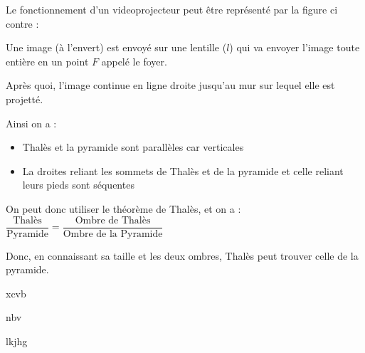 \begin{minipage}[t]{0.55\textwidth}

    Le fonctionnement d'un videoprojecteur peut être représenté par la figure ci contre :

    Une image (à l'envert) est envoyé sur une lentille ($l$) qui va envoyer l'image toute entière en un point $F$ appelé le foyer. 

    Après quoi, l'image continue en ligne droite jusqu'au mur sur lequel elle est projetté.

    Ainsi on a :
    \begin{itemize}
        \item Thalès et la pyramide sont parallèles car verticales
        \item La droites reliant les sommets de Thalès et de la pyramide et celle reliant leurs pieds sont séquentes
    \end{itemize}

    On peut donc utiliser le théorème de Thalès, et on a :\\
    $\dfrac{\text{Thalès}}{\text{Pyramide}}=\dfrac{\text{Ombre de Thalès}}{\text{Ombre de la Pyramide}}$

    Donc, en connaissant sa taille et les deux ombres, Thalès peut trouver celle de la pyramide.
    
\end{minipage}
\hfill
\begin{minipage}[t]{0.35\textwidth}
        \begin{figure}[H]
        \centering
    \end{figure} 
\end{minipage}


xcvb

nbv

lkjhg
